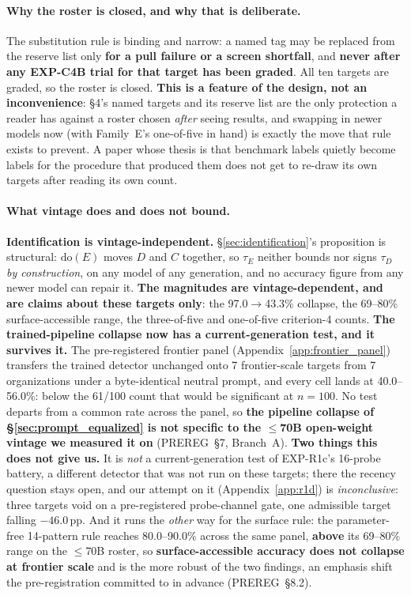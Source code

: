 \paragraph{Why the roster is closed, and why that is deliberate.} The substitution rule is binding and narrow: a named tag may be replaced from the reserve list only \textbf{for a pull failure or a screen shortfall}, and \textbf{never after any EXP-C4B trial for that target has been graded}. All ten targets are graded, so the roster is closed. \textbf{This is a feature of the design, not an inconvenience}: §4's named targets and its reserve list are the only protection a reader has against a roster chosen \emph{after} seeing results, and swapping in newer models now (with Family~E's one-of-five in hand) is exactly the move that rule exists to prevent. A paper whose thesis is that benchmark labels quietly become labels for the procedure that produced them does not get to re-draw its own targets after reading its own count.

\paragraph{What vintage does and does not bound.} \textbf{Identification is vintage-independent.} §\ref{sec:identification}'s proposition is structural: $\mathrm{do}(E)$ moves $D$ and $C$ together, so $\tau_E$ neither bounds nor signs $\tau_D$ \emph{by construction}, on any model of any generation, and no accuracy figure from any newer model can repair it. \textbf{The magnitudes are vintage-dependent, and are claims about these targets only}: the 97.0$\to$43.3\% collapse, the 69--80\% surface-accessible range, the three-of-five and one-of-five criterion-4 counts. \textbf{The trained-pipeline collapse now has a current-generation test, and it survives it.} The pre-registered frontier panel (Appendix~\ref{app:frontier_panel}) transfers the trained detector unchanged onto 7 frontier-scale targets from 7 organizations under a byte-identical neutral prompt, and every cell lands at 40.0--56.0\%: below the 61/100 count that would be significant at $n\!=\!100$. No test departs from a common rate across the panel, so \textbf{the pipeline collapse of §\ref{sec:prompt_equalized} is not specific to the $\leq$70B open-weight vintage we measured it on} (PREREG~§7, Branch~A). \textbf{Two things this does not give us.} It is \emph{not} a current-generation test of EXP-R1c's 16-probe battery, a different detector that was not run on these targets; there the recency question stays open, and our attempt on it (Appendix~\ref{app:r1d}) is \emph{inconclusive}: three targets void on a pre-registered probe-channel gate, one admissible target falling $-46.0$\,pp. And it runs the \emph{other} way for the surface rule: the parameter-free 14-pattern rule reaches 80.0--90.0\% across the same panel, \textbf{above} its 69--80\% range on the $\leq$70B roster, so \textbf{surface-accessible accuracy does not collapse at frontier scale} and is the more robust of the two findings, an emphasis shift the pre-registration committed to in advance (PREREG~§8.2).

